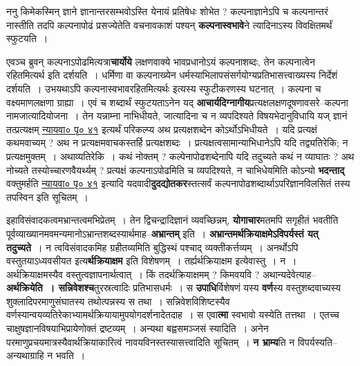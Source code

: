 \documentclass[article,12pt,a4paper]{memoir}
\begin{document}
	  \endgroup
	

	  \pstart ननु किमेकस्मिन् ज्ञाने ज्ञानान्तरसम्भवोऽस्ति येनायं प्रतिषेधः शोभेत ? कल्पनाज्ञानेऽपि च कल्पनान्तरं नास्तीति तदपि कल्पनापोढं प्रसज्येतेति वचनावकाशं पश्यन् \textbf{कल्पनास्वभावे}ने त्यादिनाऽस्य विवक्षितमर्थं स्फुटयति ।
	\pend
      

	  \pstart एवञ्च ब्रुवन् कल्पनाऽपोढमित्यत्रा\textbf{चार्योये} लक्षणवाक्ये भावप्रधानोऽयं कल्पनाशब्दः, तेन कल्पनात्वेन रहितमित्यर्थ इति दर्शयति । धर्मिणा वा कल्पनाख्येन धर्मस्याभिलापसंसर्गयोग्यप्रतिभासत्त्वाख्यस्य निर्देशं दर्शयति । उभयथाऽपि कल्पनास्वभावरहितमित्यर्थः इत्यस्य स्फुटीकरणस्य घटनात् । कल्पना च वक्ष्यमाणलक्षणा ग्राह्या । एवं च शब्दार्थं स्फुटयताऽनेन यद् \textbf{आचार्यदिग्नागीय}प्रत्यक्षलक्षणदूषणावसरे--कल्पना नामजात्यादियोजना । तेन यन्नाम्ना नाभिधीयते, जात्यादिना च न व्यपदिश्यते विषयभेदानुविधायि यज् ज्ञानं तत्प्रत्यक्षम्  \href{http://sarit.indology.info/?cref=nv.1.1.p44.1}{न्यायवा० पृ० ४१} इत्यर्थं परिकल्प्य अथ प्रत्यक्षशब्देन कोऽर्थोऽभिधीयते । यदि प्रत्यक्षं कथमवाच्यम् ? अथ न प्रत्यक्षमवाचकस्तर्हि प्रत्यक्षशब्दः । प्रत्यक्षत्वसामान्याभिधानेऽपि यदि तद्व्यतिरेकि; न प्रत्यक्षमुक्तम् । अथाव्यतिरेकि । कथं नोक्तम् ? कल्पेनापोढशब्देनापि यदि तदुच्यते कथं न व्याघातः ? अथ नोच्यते तस्योच्चारणवैयर्थ्यम् ? प्रत्यक्षं कल्पनाऽपोढमिति च व्यपदिश्यते, न चाभिधेयमिति कोऽन्यो \textbf{भदन्ताद्} वक्तुमर्हति \href{http://sarit.indology.info/?cref=nv.1.1.p44-6-12}{न्यायवा० पृ० ४१} इत्यादि यदवादी\textbf{दुदद्योतकर}स्तत्सर्वं कल्पनापोढशब्दार्थाऽपरिज्ञानविलसितं तस्य तपस्विन इति सूचितम् ।
	\pend
      

	  \pstart इहाविसंवादकत्वमभ्रान्तत्वमभिप्रेतम् । तेन द्विचन्द्रादिज्ञानं व्यवच्छिन्नम्, \textbf{योगाचार}मतमपि सगृहीतं भवतीति पूर्वव्याख्यानमवमन्यमानोऽभ्रान्तशब्दस्यार्थमाह--\textbf{अभ्रान्तम्} इति । \textbf{अभ्रान्तमर्थक्रियाक्षमेऽविपर्यस्तं यत् तदुच्यते} । न त्वविसंवादकमिह ग्रहीतव्यमिति बुद्धिस्थं पश्चाद् व्यक्तीकर्त्तव्यम् । अनर्थोऽपि वस्तुतयाऽध्यवसीयत इत्य\textbf{र्थक्रियाक्षम} इति विशेषणम् । तर्ह्यर्थक्रियाक्षम इत्येवास्तु । न । अर्थक्रियाक्षमस्यैव वस्तुत्वज्ञापनार्थत्वात् । किं तदर्थक्रियाक्षमम् ? किमवयवि ? अथान्यदेवेत्याह--\textbf{अर्थक्रियेति । सन्निवेशश्च}तुरस्रत्वादिः प्रतिभासधर्मः । स \textbf{उपाधि}र्विशेषणं यस्य \textbf{वर्ण}स्य वस्तुशब्दवाच्यस्य शुक्लादिपरमाणुसंघातस्य तथोत्पन्नस्य स तथा । सन्निवेशविशिष्टस्यैव वर्णस्यान्वयव्यतिरेकाभ्यामर्थक्रियायामुपयोगदर्शनादेतदाह । स एवा\textbf{त्मा} स्वभावो यस्येति तत्तथा । एतच्च चाक्षुषज्ञानविषयाभिप्रायेणोक्तं द्रष्टव्यम् । अन्यथा बह्वसमञ्जसं स्यादिति । अनेन परमाणुप्रचयमात्रस्यैवार्थक्रि\leavevmode{}याकारित्वं नावयविनस्तस्यासत्त्वादिति सूचितम् । \textbf{न भ्राम्य}ति न विपर्यस्यति--अन्यथाग्राहि न भवति ।
	\pend
      
\end{document}
